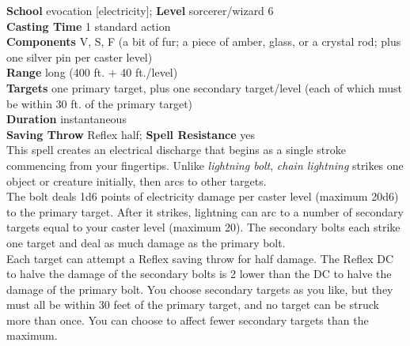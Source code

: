 \textbf{School} evocation [electricity]; \textbf{Level} sorcerer/wizard 6\\
\textbf{Casting Time} 1 standard action\\
\textbf{Components} V, S, F (a bit of fur; a piece of amber, glass, or a crystal rod; plus one silver pin per caster level)\\
\textbf{Range} long (400 ft. + 40 ft./level)\\
\textbf{Targets} one primary target, plus one secondary target/level (each of which must be within 30 ft. of the primary target)\\
\textbf{Duration} instantaneous\\
\textbf{Saving Throw} Reflex half; \textbf{Spell Resistance} yes\\
This spell creates an electrical discharge that begins as a single stroke commencing from your fingertips. Unlike \textit{lightning bolt}, \textit{chain lightning }strikes one object or creature initially, then arcs to other targets.\\
The bolt deals 1d6 points of electricity damage per caster level (maximum 20d6) to the primary target. After it strikes, lightning can arc to a number of secondary targets equal to your caster level (maximum 20). The secondary bolts each strike one target and deal as much damage as the primary bolt.\\
Each target can attempt a Reflex saving throw for half damage. The Reflex DC to halve the damage of the secondary bolts is 2 lower than the DC to halve the damage of the primary bolt. You choose secondary targets as you like, but they must all be within 30 feet of the primary target, and no target can be struck more than once. You can choose to affect fewer secondary targets than the maximum.\\
